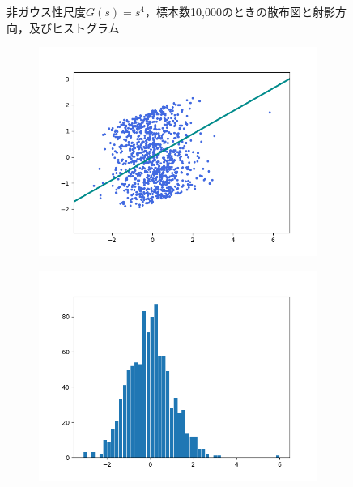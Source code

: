\documentclass[class=jsarticle, crop=false, dvipdfmx, fleqn]{standalone}
\begin{document}
\begin{figure}
\begin{minipage}{0.45\linewidth}
\begin{figure}[H]
            \label{fig:s4_n10000_hist}
        \end{figure}
    \end{minipage}
    \caption{非ガウス性尺度\(G(s) = s^4\)，標本数10,000のときの散布図と射影方向，及びヒストグラム}
    \label{fig:s4_n10000}
\end{figure}


\clearpage
\begin{figure}
	\centering
    \begin{minipage}{0.45\linewidth}
        \begin{figure}[H]
        	   \centering
            \includegraphics[clip, width=\linewidth]{../figures/assignment2_result_logcosh_n1000_scatter.png}
            \label{fig:logcosh_n1000_scatter}
        \end{figure}
    \end{minipage}
    \begin{minipage}{0.45\linewidth}
        \begin{figure}[H]
            \centering
            \includegraphics[clip, width=\linewidth]{../figures/assignment2_result_logcosh_n1000_hist.png}

\end{figure}
\end{minipage}
\end{figure}
\end{document}
